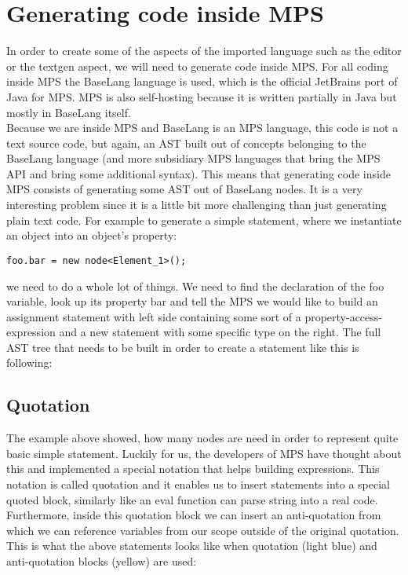 \section{Generating code inside MPS}
\label{chap:generating_code_inside_mps}

In order to create some of the aspects of the imported language such as the editor or the textgen aspect, we will need to generate code inside MPS. For all coding inside MPS the BaseLang language is used, which is the official JetBrains port of Java for MPS. MPS is also self-hosting because it is written partially in Java but mostly in BaseLang itself.
\\

Because we are inside MPS and BaseLang is an MPS language, this code is not a text source code, but again, an AST built out of concepts belonging to the BaseLang language (and more subsidiary MPS languages that bring the MPS API and bring some additional syntax). This means that generating code inside MPS consists of generating some AST out of BaseLang nodes. It is a very interesting problem since it is a little bit more challenging than just generating plain text code. For example to generate a simple statement, where we instantiate an object into an object's property:

\begin{center}
	\texttt{foo.bar = new node<Element{\_}1>();}
\end{center}

\noindent
we need to do a whole lot of things. We need to find the declaration of the foo variable, look up its property bar and tell the MPS we would like to build an assignment statement with left side containing some sort of a property-access-expression and a new statement with some specific type on the right. The full AST tree that needs to be built in order to create a statement like this is following:



\subsection{Quotation}
The example above showed, how many nodes are need in order to represent quite basic simple statement. Luckily for us, the developers of MPS have thought about this and implemented a special notation that helps building expressions. This notation is called quotation and it enables us to insert statements into a special quoted block, similarly like an eval function can parse string into a real code. Furthermore, inside this quotation block we can insert an anti-quotation from which we can reference variables from our scope outside of the original quotation. This is what the above statements looks like when quotation (light blue) and anti-quotation blocks (yellow) are used:

